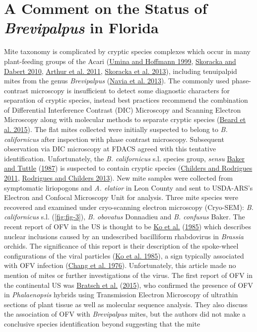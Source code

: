 \documentclass[12pt,final,CPage]{ufthesis}
\begin{document}
{{  \section{\texorpdfstring{A Comment on the Status of \emph{Brevipalpus} in Florida}{A Comment on the Status of Brevipalpus in Florida}}\label{a-comment-on-the-status-of-brevipalpus-in-florida}}

  Mite taxonomy is complicated by cryptic species complexes which occur in many plant-feeding groups of the Acari (\protect\hyperlink{ref-Umina1999}{Umina and Hoffmann 1999}, \protect\hyperlink{ref-Skoracka2010}{Skoracka and Dabert 2010}, \protect\hyperlink{ref-Arthur2011}{Arthur et al. 2011}, \protect\hyperlink{ref-Skoracka2013}{Skoracka et al. 2013}), including tenuipalpid mites from the genus \emph{Brevipalpus} (\protect\hyperlink{ref-Navia2013}{Navia et al. 2013}). The commonly used phase-contrast microscopy is insufficient to detect some diagnostic characters for separation of cryptic species, instead best practices recommend the combination of Differential Interference Contrast (DIC) Microscopy and Scanning Electron Microscopy along with molecular methods to separate cryptic species (\protect\hyperlink{ref-Beard2015}{Beard et al. 2015}). The flat mites collected were initially suspected to belong to \emph{B. californicus} after inspection with phase contrast microscopy. Subsequent observation via DIC microscopy at FDACS agreed with this tentative identification. Unfortunately, the \emph{B. californicus} s.l. species group, \emph{sensu} \protect\hyperlink{ref-Baker1987}{Baker and Tuttle} (\protect\hyperlink{ref-Baker1987}{1987}) is suspected to contain cryptic species (\protect\hyperlink{ref-Childers2011}{Childers and Rodrigues 2011}, \protect\hyperlink{ref-Rodrigues2013}{Rodrigues and Childers 2013}). New mite samples were collected from symptomatic liriopogons and \emph{A. elatior} in Leon County and sent to USDA-ARS's Electron and Confocal Microscopy Unit for analysis. Three mite species were recovered and examined under cryo-scanning electron microscopy (Cryo-SEM): \emph{B. californicus} s.l. (\ref{fig:fig-3}), \emph{B. obovatus} Donnadieu and \emph{B. confusus} Baker. The recent report of OFV in the US is thought to be \protect\hyperlink{ref-Ko1985}{Ko et al.} (\protect\hyperlink{ref-Ko1985}{1985}) which describes nuclear inclusions caused by an undescribed bacilliform rhabdovirus in \emph{Brassia} orchids. The significance of this report is their description of the spoke-wheel configurations of the viral particles (\protect\hyperlink{ref-Ko1985}{Ko et al. 1985}), a sign typically associated with OFV infection (\protect\hyperlink{ref-Chang1976}{Chang et al. 1976}). Unfortunately, this article made no mention of mites or further investigations of the virus. The first report of OFV in the continental US was \protect\hyperlink{ref-Bratsch2015}{Bratsch et al.} (\protect\hyperlink{ref-Bratsch2015}{2015}), who confirmed the presence of OFV in \emph{Phalaenopsis} hybrids using Transmission Electron Microscopy of ultrathin sections of plant tissue as well as molecular sequence analysis. They also discuss the association of OFV with \emph{Brevipalpus} mites, but the authors did not make a conclusive species identification beyond suggesting that the mite }
\end{document}
